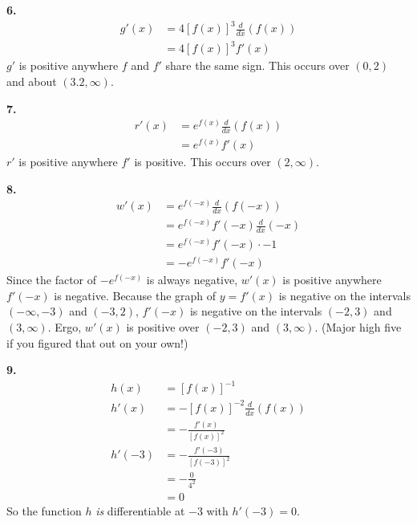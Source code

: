 \documentclass[10pt,oneside,]{book}
\theoremstyle{plain}
\theoremstyle{definition}
\numberwithin{equation}{section}
\newcommand{\fe}[2]{#1\mathopen{}\left(#2\right)\mathclose{}}
\newcommand{\ointerval}[2]{\left(#1,#2\right)}
\newcommand{\fd}[1]{#1'}
\newcommand{\lzoo}[2]{{\frac{d}{d#1}}{\left(#2\right)}}
\begin{document}
\par\smallskip
\noindent\textbf{6.}\quad{}\begin{align*}
\fe{\fd{g}}{x}&=4\left[\fe{f}{x}\right]^3\lzoo{x}{\fe{f}{x}}\\
&=4\left[\fe{f}{x}\right]^3\fe{\fd{f}}{x}
\end{align*}\(\fd{g}\) is positive anywhere \(f\) and \(\fd{f}\) share the same sign. This occurs over \(\ointerval{0}{2}\) and about \(\ointerval{3.2}{\infty}\).%
\par\smallskip
\noindent\textbf{7.}\quad{}\begin{align*}
\fe{\fd{r}}{x}&=e^{\fe{f}{x}}\lzoo{x}{\fe{f}{x}}\\
&=e^{\fe{f}{x}}\fe{\fd{f}}{x}
\end{align*}\(\fd{r}\) is positive anywhere \(\fd{f}\) is positive. This occurs over \(\ointerval{2}{\infty}\).%
\par\smallskip
\noindent\textbf{8.}\quad{}\begin{align*}
\fe{\fd{w}}{x}&=e^{\fe{f}{-x}}\lzoo{x}{\fe{f}{-x}}\\
&=e^{\fe{f}{-x}}\fe{\fd{f}}{-x}\lzoo{x}{-x}\\
&=e^{\fe{f}{-x}}\fe{\fd{f}}{-x}\cdot-1\\
&=-e^{\fe{f}{-x}}\fe{\fd{f}}{-x}
\end{align*}Since the factor of \(-e^{\fe{f}{-x}}\) is always negative, \(\fe{\fd{w}}{x}\) is positive anywhere \(\fe{\fd{f}}{-x}\) is negative.  Because the graph of \(y=\fe{\fd{f}}{x}\) is negative on the intervals \(\ointerval{-\infty}{-3}\) and \(\ointerval{-3}{2}\), \(\fe{\fd{f}}{-x}\) is negative on the intervals \(\ointerval{-2}{3}\) and \(\ointerval{3}{\infty}\).  Ergo, \(\fe{\fd{w}}{x}\) is positive over \(\ointerval{-2}{3}\) and \(\ointerval{3}{\infty}\).  (Major high five if you figured that out on your own!)%
\par\smallskip
\noindent\textbf{9.}\quad{}\begin{align*}
\fe{h}{x}&=\left[\fe{f}{x}\right]^{-1}\\
\fe{\fd{h}}{x}&=-\left[\fe{f}{x}\right]^{-2}\lzoo{x}{\fe{f}{x}}\\
&=-\frac{\fe{\fd{f}}{x}}{\left[\fe{f}{x}\right]^2}\\
\fe{\fd{h}}{-3}&=-\frac{\fe{\fd{f}}{-3}}{\left[\fe{f}{-3}\right]^2}\\
&=-\frac{0}{4^2}\\
&=0
\end{align*}So the function \(h\) \emph{is} differentiable at \(-3\) with \(\fe{\fd{h}}{-3}=0\).%
\end{document}
